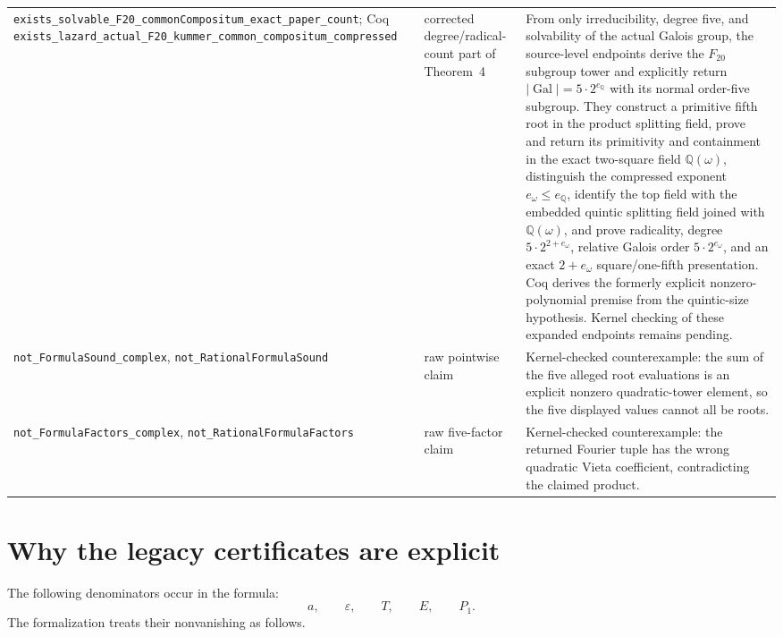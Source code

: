 \documentclass[11pt,a4paper,oneside]{article}
\newcommand{\lean}[1]{\nolinkurl{#1}}
\newcommand{\Q}{\mathbb{Q}}
\newcommand{\eps}{\varepsilon}
\begin{document}
\begin{longtable}{>{\raggedright\arraybackslash}p{}
                  >{\raggedright\arraybackslash}p{}
                  >{\raggedright\arraybackslash}p{}}
\lean{exists_solvable_F20_commonCompositum_exact_paper_count}; Coq \lean{exists_lazard_actual_F20_kummer_common_compositum_compressed} & corrected degree/radical-count part of Theorem~4 & From only irreducibility, degree five, and solvability of the actual Galois group, the source-level endpoints derive the $F_{20}$ subgroup tower and explicitly return $|\operatorname{Gal}|=5\cdot2^{e_{\Q}}$ with its normal order-five subgroup.  They construct a primitive fifth root in the product splitting field, prove and return its primitivity and containment in the exact two-square field $\Q(\omega)$, distinguish the compressed exponent $e_\omega\le e_{\Q}$, identify the top field with the embedded quintic splitting field joined with $\Q(\omega)$, and prove radicality, degree $5\cdot2^{2+e_\omega}$, relative Galois order $5\cdot2^{e_\omega}$, and an exact $2+e_\omega$ square/one-fifth presentation.  Coq derives the formerly explicit nonzero-polynomial premise from the quintic-size hypothesis.  Kernel checking of these expanded endpoints remains pending.\\
\lean{not_FormulaSound_complex}, \lean{not_RationalFormulaSound} & raw pointwise claim & Kernel-checked counterexample: the sum of the five alleged root evaluations is an explicit nonzero quadratic-tower element, so the five displayed values cannot all be roots.\\
\lean{not_FormulaFactors_complex}, \lean{not_RationalFormulaFactors} & raw five-factor claim & Kernel-checked counterexample: the returned Fourier tuple has the wrong quadratic Vieta coefficient, contradicting the claimed product.\\
\bottomrule
\end{longtable}
\normalsize

\section{Why the legacy certificates are explicit}

The following denominators occur in the formula:
\[
 a,\qquad \eps,\qquad T,\qquad E,\qquad P_1.
\]
The formalization treats their nonvanishing as follows.
\end{document}
